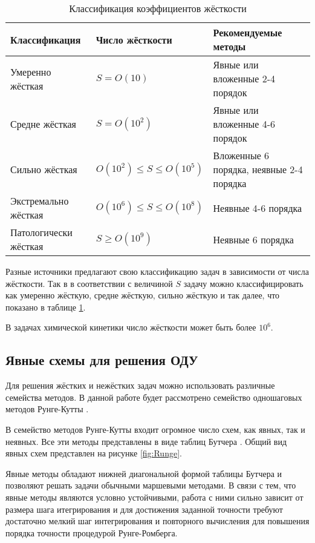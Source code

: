 \begin{table}  
    \caption{Классификация коэффициентов жёсткости}
    \begin{tabularx}{\textwidth}{|l|l|X|}
    \hline
    Классификация & Число жёсткости & Рекомендуемые методы\\
    \hline
    Умеренно жёсткая & {\small$S = O(10)$} & Явные или вложенные 2-4 порядок\\
    \hline
    Средне жёсткая & {\small$S = O(10^2)$} & Явные или вложенные 4-6 порядок\\
    \hline
    Сильно жёсткая & {\small$O(10^2) \leq S \leq O(10^5)$} & Вложенные 6 порядка, неявные 2-4 порядка\\
    \hline
    Экстремально жёсткая & {\small$O(10^6) \leq S \leq O(10^8)$} & Неявные 4-6 порядка\\
    \hline
    Патологически жёсткая & {\small$S \geq O(10^9)$} & Неявные 6 порядка\\
    \hline
    \end{tabularx}
    \label{tab:ToughCoeff}
\end{table}

Разные источники
предлагают свою классификацию задач в зависимости от числа жёсткости. Так в \cite{Article3} в соответствии с величиной $S$ задачу
можно классифицировать как умеренно жёсткую,
средне жёсткую, сильно жёсткую и так далее, что показано в таблице \ref{tab:ToughCoeff}.

В задачах химической кинетики число жёсткости может быть более $10^6$.

\subsection{Явные схемы для решения ОДУ}

Для решения жёстких и нежёстких задач можно использовать различные семейства методов. В данной работе будет рассмотрено семейство
одношаговых методов Рунге-Кутты \cite{book9}.

В семейство методов Рунге-Кутты входит огромное число схем, как явных, так и неявных. Все эти методы представлены в виде таблиц
Бутчера \cite{book1, cite_1_3}. Общий вид явных схем представлен на рисунке \ref{fig:Runge}.

Явные методы обладают нижней диагональной формой таблицы Бутчера и позволяют решать задачи обычными маршевыми методами. В связи с тем,
что явные методы являются условно устойчивыми, работа с ними сильно зависит от размера шага итегрирования и для достижения заданной
точности требуют достаточно мелкий шаг интегрирования и повторного вычисления для повышения порядка точности процедурой Рунге-Ромберга.

